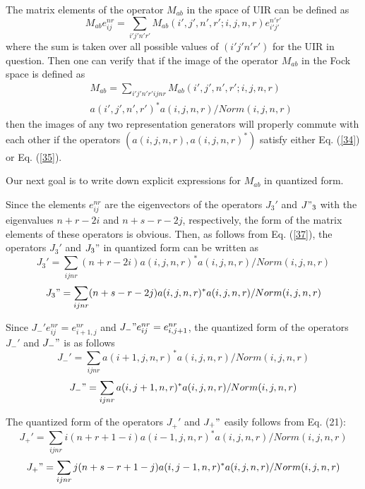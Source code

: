 \documentclass[a4paper,12pt]{article}%
\begin{document}
The matrix elements of the operator $M_{ab}$ in
the space of UIR can be defined as
\begin{equation}
M_{ab}e^{nr}_{ij}=\sum_{i'j'n'r'}
M_{ab}(i',j',n',r';i,j,n,r)e^{n'r'}_{i'j'}
\label{36}
\end{equation}
where the sum is taken over all possible values of
$(i'j'n'r')$ for the UIR in question. Then one can
verify that if the image of the operator $M_{ab}$
in the Fock space is defined as
\begin{eqnarray}
&&M_{ab}=\sum_{i'j'n'r'ijnr}
M_{ab}(i',j',n',r';i,j,n,r)\nonumber\\
&&a(i',j',n',r')^*a(i,j,n,r)/Norm(i,j,n,r)
\label{37}
\end{eqnarray}
then the images of any two representation generators
will properly commute with each other if the
operators $(a(i,j,n,r),a(i,j,n,r)^*)$ satisfy either
Eq. (\ref{34}) or Eq. (\ref{35}).

Our next goal is to write down explicit expressions
for $M_{ab}$ in quantized form. 

Since the elements $e^{nr}_{ij}$ are the eigenvectors
of the operators $J_3'$ and $J"_3$ with the eigenvalues
$n+r-2i$ and $n+s-r-2j$, respectively, the form of
the matrix elements of these operators is obvious.
Then, as follows from Eq. (\ref{37}), the operators
$J_3'$ and $J_3"$ in quantized form can
be written as
\begin{equation}
J_3'=\sum_{ijnr}(n+r-2i)a(i,j,n,r)^*a(i,j,n,r)/Norm(i,j,n,r)
\label{38}
\end{equation}
\begin{equation}
J_3"=\sum_{ijnr}(n+s-r-2j)a(i,j,n,r)^*a(i,j,n,r)/Norm(i,j,n,r)
\label{39}
\end{equation}

Since $J_-'e^{nr}_{ij}=e^{nr}_{i+1,j}$ and
$J_-"e^{nr}_{ij}=e^{nr}_{i,j+1}$, the quantized
form of the operators $J_-'$ and $J_-"$ is as follows
\begin{equation}
J_-'=\sum_{ijnr}a(i+1,j,n,r)^*a(i,j,n,r)/Norm(i,j,n,r)
\label{40}
\end{equation}
\begin{equation}
J_-"=\sum_{ijnr}a(i,j+1,n,r)^*a(i,j,n,r)/Norm(i,j,n,r)
\label{41}
\end{equation}

The quantized form of the operators $J_+'$
and $J_+"$ easily follows from Eq. (21):
\begin{equation}
J_+'=\sum_{ijnr}i(n+r+1-i)a(i-1,j,n,r)^*a(i,j,n,r)/Norm(i,j,n,r)
\label{42}
\end{equation}
\begin{equation}
J_+"=\sum_{ijnr}j(n+s-r+1-j)a(i,j-1,n,r)^*a(i,j,n,r)/Norm(i,j,n,r)
\label{43}
\end{equation}
\end{document}
